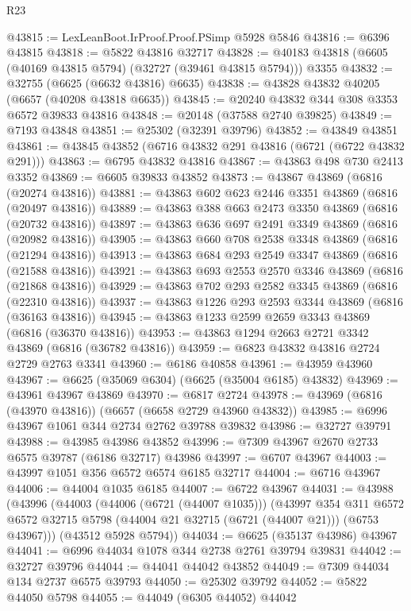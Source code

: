 \begin{lexlean}{R23}
\begin{coremodule}
@43815 := LexLeanBoot.IrProof.Proof.PSimp @5928 @5846
@43816 := @6396 @43815
@43818 := @5822 @43816 @32717
@43828 := @40183 @43818 (@6605 (@40169 @43815 @5794) (@32727 (@39461 @43815 @5794))) @3355
@43832 := @32755 (@6625 (@6632 @43816) @6635)
@43838 := @43828 @43832 @40205 (@6657 (@40208 @43818 @6635))
@43845 := @20240 @43832 @344 @308 @3353 @6572 @39833 @43816
@43848 := @20148 (@37588 @2740 @39825)
@43849 := @7193 @43848
@43851 := @25302 (@32391 @39796)
@43852 := @43849 @43851
@43861 := @43845 @43852 (@6716 @43832 @291 @43816 (@6721 (@6722 @43832 @291)))
@43863 := @6795 @43832 @43816
@43867 := @43863 @498 @730 @2413 @3352
@43869 := @6605 @39833 @43852
@43873 := @43867 @43869 (@6816 (@20274 @43816))
@43881 := @43863 @602 @623 @2446 @3351 @43869 (@6816 (@20497 @43816))
@43889 := @43863 @388 @663 @2473 @3350 @43869 (@6816 (@20732 @43816))
@43897 := @43863 @636 @697 @2491 @3349 @43869 (@6816 (@20982 @43816))
@43905 := @43863 @660 @708 @2538 @3348 @43869 (@6816 (@21294 @43816))
@43913 := @43863 @684 @293 @2549 @3347 @43869 (@6816 (@21588 @43816))
@43921 := @43863 @693 @2553 @2570 @3346 @43869 (@6816 (@21868 @43816))
@43929 := @43863 @702 @293 @2582 @3345 @43869 (@6816 (@22310 @43816))
@43937 := @43863 @1226 @293 @2593 @3344 @43869 (@6816 (@36163 @43816))
@43945 := @43863 @1233 @2599 @2659 @3343 @43869 (@6816 (@36370 @43816))
@43953 := @43863 @1294 @2663 @2721 @3342 @43869 (@6816 (@36782 @43816))
@43959 := @6823 @43832 @43816 @2724 @2729 @2763 @3341
@43960 := @6186 @40858
@43961 := @43959 @43960
@43967 := @6625 (@35069 @6304) (@6625 (@35004 @6185) @43832)
@43969 := @43961 @43967 @43869
@43970 := @6817 @2724
@43978 := @43969 (@6816 (@43970 @43816)) (@6657 (@6658 @2729 @43960 @43832))
@43985 := @6996 @43967 @1061 @344 @2734 @2762 @39788 @39832
@43986 := @32727 @39791
@43988 := @43985 @43986 @43852
@43996 := @7309 @43967 @2670 @2733 @6575 @39787 (@6186 @32717) @43986
@43997 := @6707 @43967
@44003 := @43997 @1051 @356 @6572 @6574 @6185 @32717
@44004 := @6716 @43967
@44006 := @44004 @1035 @6185
@44007 := @6722 @43967
@44031 := @43988
    (@43996
      (@44003
        (@44006 (@6721 (@44007 @1035)))
        (@43997
          @354
          @311
          @6572
          @6572
          @32715
          @5798
          (@44004 @21 @32715 (@6721 (@44007 @21)))
          (@6753 @43967)))
      (@43512 @5928 @5794))
@44034 := @6625 (@35137 @43986) @43967
@44041 := @6996 @44034 @1078 @344 @2738 @2761 @39794 @39831
@44042 := @32727 @39796
@44044 := @44041 @44042 @43852
@44049 := @7309 @44034 @134 @2737 @6575 @39793
@44050 := @25302 @39792
@44052 := @5822 @44050 @5798
@44055 := @44049 (@6305 @44052) @44042

\end{coremodule}
\end{lexlean}
